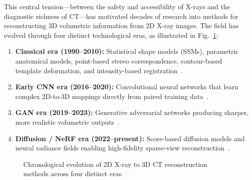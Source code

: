 \documentclass[10pt,twocolumn,a4paper]{article}
\begin{document}
This central tension---between the safety and accessibility of X-rays and the
diagnostic richness of CT---has motivated decades of research into methods for
reconstructing 3D volumetric information from 2D X-ray images. The field has
evolved through four distinct technological eras, as illustrated in
Fig.~\ref{fig:timeline}:
\begin{enumerate}[leftmargin=*,topsep=2pt,itemsep=1pt]
\item \textbf{Classical era (1990--2010):} Statistical shape models (SSMs),
  parametric anatomical models, point-based stereo correspondence, contour-based
  template deformation, and intensity-based registration~\cite{maken2023}.
\item \textbf{Early CNN era (2016--2020):} Convolutional neural networks that
  learn complex 2D-to-3D mappings directly from paired training
  data~\cite{kasten2020,dixit2019,kim2019}.
\item \textbf{GAN era (2019--2023):} Generative adversarial networks producing
  sharper, more realistic volumetric outputs~\cite{x2ctgan,trctgan,dpganb}.
\item \textbf{Diffusion / NeRF era (2022--present):} Score-based diffusion models
  and neural radiance fields enabling high-fidelity sparse-view
  reconstruction~\cite{dx2ct,dvgdiffusion,mednerf,x2br}.
\end{enumerate}

\begin{figure}[h]
\centering
{}
\caption{Chronological evolution of 2D X-ray to 3D CT reconstruction methods
across four distinct eras.}
\label{fig:timeline}
\end{figure}
\end{document}
